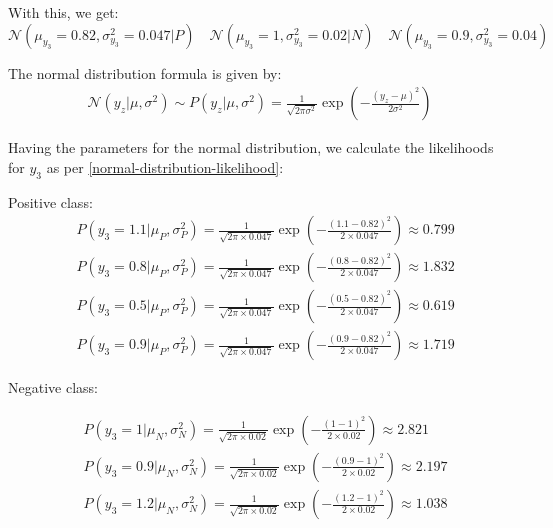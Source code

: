 \documentclass[12pt]{article}
\begin{document}
\begin{enumerate}[leftmargin=\labelsep]
\vspace{10pt}
With this, we get:
\begin{equation*}
    \mathcal{N}(\mu_{y_3} = 0.82, \sigma_{y_3}^2 = 0.047|P) \quad \mathcal{N}(\mu_{y_3} = 1, \sigma_{y_3}^2 = 0.02|N) \quad \mathcal{N}(\mu_{y_3} = 0.9, \sigma_{y_3}^2 = 0.04)  
\end{equation*}

\vspace{10pt}
    The normal distribution formula is given by:
    \begin{equation}\label{normal-distribution-likelihood}
        \begin{aligned}
            \mathcal{N}(y_z|\mu, \sigma^2) \sim P(y_z|\mu, \sigma^2) = \frac{1}{\sqrt{2\pi \sigma^2}} \exp\left(-\frac{(y_z - \mu)^2}{2\sigma^2}\right)
        \end{aligned}
    \end{equation}

    \newpage
    Having the parameters for the normal distribution, we calculate the likelihoods for $y_3$ as per \eqref{normal-distribution-likelihood}:
    
    \vspace{10pt}
    Positive class:
    \begin{equation*}
        \begin{aligned}
            &P(y_3 = 1.1|\mu_P, \sigma_P^2) = \frac{1}{\sqrt{2\pi \times 0.047}} \exp\left(-\frac{(1.1 - 0.82)^2}{2 \times 0.047}\right) \approx 0.799\\
            &P(y_3 = 0.8|\mu_P, \sigma_P^2) = \frac{1}{\sqrt{2\pi \times 0.047}} \exp\left(-\frac{(0.8 - 0.82)^2}{2 \times 0.047}\right) \approx 1.832\\
            &P(y_3 = 0.5|\mu_P, \sigma_P^2) = \frac{1}{\sqrt{2\pi \times 0.047}} \exp\left(-\frac{(0.5 - 0.82)^2}{2 \times 0.047}\right) \approx 0.619\\
            &P(y_3 = 0.9|\mu_P, \sigma_P^2) = \frac{1}{\sqrt{2\pi \times 0.047}} \exp\left(-\frac{(0.9 - 0.82)^2}{2 \times 0.047}\right) \approx 1.719
        \end{aligned}
    \end{equation*}


    \vspace{10pt}
    Negative class:
    
    \begin{equation*}
        \begin{aligned}
            &P(y_3 = 1|\mu_N, \sigma_N^2) = \frac{1}{\sqrt{2\pi \times 0.02}} \exp\left(-\frac{(1 - 1)^2}{2 \times 0.02}\right) \approx 2.821 \\
            &P(y_3 = 0.9|\mu_N, \sigma_N^2) = \frac{1}{\sqrt{2\pi \times 0.02}} \exp\left(-\frac{(0.9 - 1)^2}{2 \times 0.02}\right) \approx 2.197 \\
            &P(y_3 = 1.2|\mu_N, \sigma_N^2) = \frac{1}{\sqrt{2\pi \times 0.02}} \exp\left(-\frac{(1.2 - 1)^2}{2 \times 0.02}\right) \approx 1.038\\
        \end{aligned}
    \end{equation*}


\end{enumerate}
\end{document}
